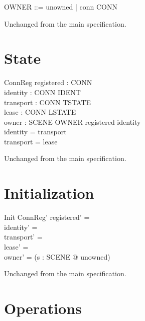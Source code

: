 \documentclass[a4paper,10pt,fleqn]{article}
\begin{document}
\begin{zed}
  OWNER ::= unowned | conn \ldata CONN \rdata
\end{zed}

Unchanged from the main specification.

\section{State}

\begin{schema}{ConnReg}
  registered : \power CONN \\
  identity : CONN \pfun IDENT \\
  transport : CONN \pfun TSTATE \\
  lease : CONN \pfun LSTATE \\
  owner : SCENE \fun OWNER
\where
  registered \subseteq \dom identity \\
  \dom identity = \dom transport \\
  \dom transport = \dom lease
\end{schema}

Unchanged from the main specification.

\section{Initialization}

\begin{schema}{Init}
  ConnReg'
\where
  registered' = \emptyset \\
  identity' = \emptyset \\
  transport' = \emptyset \\
  lease' = \emptyset \\
  owner' = (\lambda s : SCENE @ unowned)
\end{schema}

Unchanged from the main specification.

\section{Operations}
\end{document}
